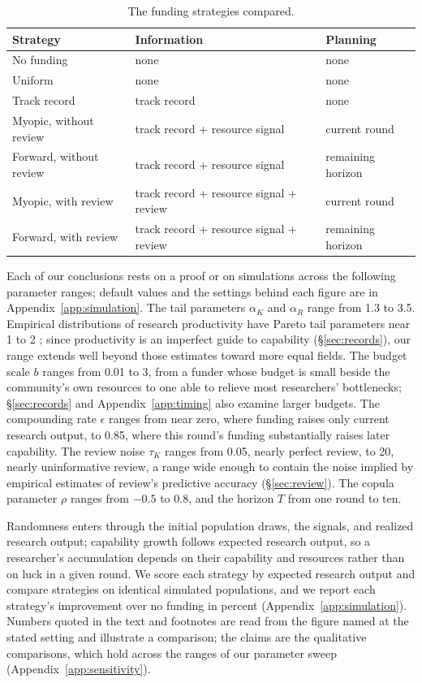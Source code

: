 \documentclass[article, 11pt, reqno]{amsart}
\theoremstyle{named}
\begin{document}
\begin{table}[t]
\centering
\footnotesize
\setlength{\tabcolsep}{4pt}
\begin{tabular*}{\textwidth}{@{\extracolsep{\fill}}lll@{}}
\toprule
Strategy & Information & Planning \\
\midrule
No funding & none & none \\
Uniform & none & none \\
Track record & track record & none \\
Myopic, without review & track record + resource signal & current round \\
Forward, without review & track record + resource signal & remaining horizon \\
Myopic, with review & track record + resource signal + review & current round \\
Forward, with review & track record + resource signal + review & remaining horizon \\
\bottomrule
\end{tabular*}
\caption{The funding strategies compared.}
\label{tab:strategies}
\end{table}

Each of our conclusions rests on a proof or on simulations across the following parameter ranges; default values and the settings behind each figure are in Appendix~\ref{app:simulation}. The tail parameters $\alpha_K$ and $\alpha_R$ range from 1.3 to 3.5. Empirical distributions of research productivity have Pareto tail parameters near 1 to 2 \citep{Lotka1926, Nicholls1989}; %
since productivity is an imperfect guide to capability (\S\ref{sec:records}), our range extends well beyond those estimates toward more equal fields. The budget scale $b$ ranges from 0.01 to 3, from a funder whose budget is small beside the community's own resources to one able to relieve most researchers' bottlenecks; \S\ref{sec:records} and Appendix~\ref{app:timing} also examine larger budgets. The compounding rate $\epsilon$ ranges from near zero, where funding raises only current research output, to 0.85, where this round's funding substantially raises later capability. The review noise $\tau_K$ ranges from 0.05, nearly perfect review, to 20, nearly uninformative review, a range wide enough to contain the noise implied by empirical estimates of review's predictive accuracy (\S\ref{sec:review}). The copula parameter $\rho$ ranges from $-0.5$ to 0.8, and the horizon $T$ from one round to ten.

Randomness enters through the initial population draws, the signals, and realized research output; capability growth follows expected research output, so a researcher's accumulation depends on their capability and resources rather than on luck in a given round. We score each strategy by expected research output and compare strategies on identical simulated populations, and we report each strategy's improvement over no funding in percent (Appendix~\ref{app:simulation}). Numbers quoted in the text and footnotes are read from the figure named at the stated setting and illustrate a comparison; the claims are the qualitative comparisons, which hold across the ranges of our parameter sweep (Appendix~\ref{app:sensitivity}).
\end{document}
